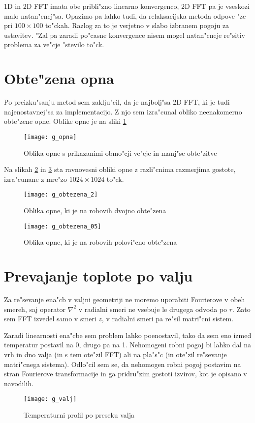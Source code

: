 \documentclass[a4paper,10pt]{article}
\begin{document}
1D in 2D FFT imata obe pribli"zno linearno konvergenco, 2D FFT pa je vseskozi malo natan"cnej"sa. Opazimo pa lahko tudi, da relaksacijska metoda odpove "ze pri $100\times 100$ to"ckah. Razlog za to je verjetno v slabo izbranem pogoju za ustavitev. "Zal pa zaradi po"casne konvergence nisem mogel natan"cneje re"sitiv problema za ve"cje "stevilo to"ck. 

\section{Obte"zena opna}

Po preizku"sanju metod sem zaklju"cil, da je najbolj"sa 2D FFT, ki je tudi najenostavnej"sa za implementacijo. Z njo sem izra"cunal obliko neenakomerno obte"zene opne. Oblike opne je na sliki \ref{fig:opna-oblika}

\begin{figure}[H]
\centering
 \texttt{[image: g\_opna]}
 \caption{Oblika opne s prikazanimi obmo"cji ve"cje in manj"se obte"zitve}
 \label{fig:opna-oblika}
\end{figure}

Na slikah \ref{fig:obtezena-2} in \ref{fig:obtezena-05} sta ravnovesni obliki opne z razli"cnima razmerjima gostote, izra"cunane z mre"zo $1024\times 1024$ to"ck. 

\begin{figure}[H]
\centering
 \texttt{[image: g\_obtezena\_2]}
 \caption{Oblika opne, ki je na robovih dvojno obte"zena}
 \label{fig:obtezena-2}
\end{figure}

\begin{figure}[H]
\centering
 \texttt{[image: g\_obtezena\_05]}
 \caption{Oblika opne, ki je na robovih polovi"cno obte"zena}
 \label{fig:obtezena-05}
\end{figure}


\section{Prevajanje toplote po valju}

Za re"sevanje ena"cb v valjni geometriji ne moremo uporabiti Fourierove v obeh smereh, saj operator $\nabla^2$ v radialni smeri ne vsebuje le drugega odvoda po $r$. Zato sem FFT izvedel samo v smeri $z$, v radialni smeri pa re"sil matri"cni sistem. 

Zaradi linearnosti ena"cbe sem problem lahko poenostavil, tako da sem eno izmed temperatur postavil na 0, drugo pa na 1. Nehomogeni robni pogoj bi lahko dal na vrh in dno valja (in s tem ote"zil FFT) ali na pla"s"c (in ote"zil re"sevanje matri"cnega sistema). Odlo"cil sem se, da nehomogen robni pogoj postavim na stran Fourierove transformacije in ga pridru"zim gostoti izvirov, kot je opisano v navodilih. 

\begin{figure}[H]
\centering
 \texttt{[image: g\_valj]}
 \caption{Temperaturni profil po preseku valja}
 \label{fig:valj}
\end{figure}
\end{document}
